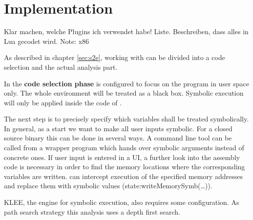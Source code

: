 \section{Implementation}\label{sec:impl}

Klar machen, welche Plugins ich verwendet habe! Liste. Beschreiben, dass alles in Lua gecodet wird. Note: x86

As described in chapter \ref{sec:s2e}, working with \sse can be divided into a code selection and the actual analysis part.

In the \textbf{code selection phase} \sse is configured to focus on the program \app in user space only.
The whole environment will be treated as a black box.
Symbolic execution will only be applied inside the code of \app.

The next step is to precisely specify which variables shall be treated symbolically.
In general, as a start we want to make all user inputs symbolic.
For a closed source binary this can be done in several ways.
A command line tool can be called from a wrapper program which hands over symbolic arguments instead of concrete ones.
If user input is entered in a UI, a further look into the assembly code is necessary in order to find the memory locations where the corresponding variables are written.
\sse can intercept execution of the specified memory addresses and replace them with symbolic values (state:writeMemorySymb(\ldots)).

KLEE, the engine for symbolic execution, also requires some configuration.
As path search strategy this analysis uses a depth first search.

